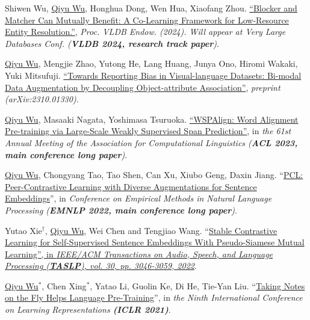 \documentclass{resume}
\begin{document}
\begin{description}[leftmargin=*]
    \item [{[C6]}] Shiwen Wu, \underline{Qiyu Wu}, Honghua Dong, Wen Hua, Xiaofang Zhou. \href{https://dl.acm.org/doi/abs/10.14778/3632093.3632096}{``Blocker and Matcher Can Mutually Benefit: A Co-Learning Framework for Low-Resource Entity Resolution.''}, \textit{Proc. VLDB Endow. (2024). Will appear at Very Large Databases Conf. (\textbf{VLDB 2024, research track paper})}.
    
    \item [{[M1]}] \underline{Qiyu Wu}, Mengjie Zhao, Yutong He, Lang Huang, Junya Ono, Hiromi Wakaki, Yuki Mitsufuji. \href{https://arxiv.org/abs/2310.01330}{``Towards Reporting Bias in Visual-language Datasets: Bi-modal Data Augmentation by Decoupling Object-attribute Association''}, \textit{preprint (arXiv:2310.01330)}.
    
    \item [{[C5]}] \underline{Qiyu Wu}, Masaaki Nagata, Yoshimasa Tsuruoka. \href{https://arxiv.org/abs/2306.05644}{``WSPAlign: Word Alignment Pre-training via Large-Scale Weakly Supervised Span Prediction''}, in \textit{the 61st Annual Meeting of the Association for Computational Linguistics (\textbf{ACL 2023, main conference long paper})}.
    
    \item [{[C4]}] \underline{Qiyu Wu}, Chongyang Tao, Tao Shen, Can Xu, Xiubo Geng, Daxin Jiang. ``\href{https://aclanthology.org/2022.emnlp-main.826.pdf}{PCL: Peer-Contrastive Learning with Diverse Augmentations for Sentence Embeddings}'', in \textit{Conference on Empirical Methods in Natural Language Processing (\textbf{EMNLP 2022, main conference long paper})}.
    
    \item [{[J1]}] Yutao Xie$^\dagger$, \underline{Qiyu Wu}, Wei Chen and Tengjiao Wang. ``\href{https://ieeexplore.ieee.org/abstract/document/9872078}{Stable Contrastive Learning for Self-Supervised Sentence Embeddings With Pseudo-Siamese Mutual Learning'', in \textit{IEEE/ACM Transactions on Audio, Speech, and Language Processing (\textbf{TASLP}), vol. 30, pp. 3046-3059, 2022}}.
    
    \item [{[C3]}] \underline{Qiyu Wu$^*$}, Chen Xing$^*$, Yatao Li, Guolin Ke, Di He, Tie-Yan Liu. ``\href{https://openreview.net/forum?id=lU5Rs_wCweN}{Taking Notes on the Fly Helps Language Pre-Training}'', in \textit{the Ninth International Conference on Learning Representations \textbf{(ICLR 2021)}}.
    

\end{description}
\end{document}
